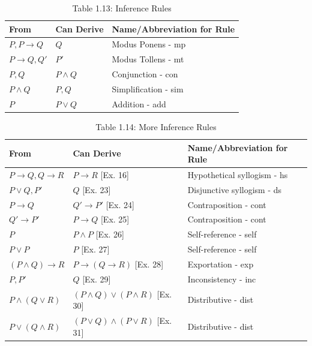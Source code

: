 \documentclass{article}
\begin{document}
\begin{table}[h]
    \centering
    \caption*{Table 1.13: Inference Rules}
    \begin{tabular}{l l l}
        \toprule
        From & Can Derive & Name/Abbreviation for Rule \\
        \midrule
        \(P, P \rightarrow Q\) & \(Q\) & Modus Ponens - mp \\
        \(P \rightarrow Q, Q'\) & \(P'\) & Modus Tollens - mt \\
        \(P, Q\) & \(P \land Q\) & Conjunction - con \\
        \(P \land Q\) & \(P, Q\) & Simplification - sim \\
        \(P\) & \(P \lor Q\) & Addition - add \\
        \bottomrule
    \end{tabular}
\end{table}

\begin{table}[h]
    \centering
    \caption*{Table 1.14: More Inference Rules}
    \begin{tabular}{l l l}
        \toprule
        From & Can Derive & Name/Abbreviation for Rule \\
        \midrule
        \(P \rightarrow Q, Q \rightarrow R\) & \(P \rightarrow R\) [Ex. 16] & Hypothetical syllogism - hs \\
        \(P \lor Q, P'\) & \(Q\) [Ex. 23] & Disjunctive syllogism - ds \\
        \(P \rightarrow Q\) & \(Q' \rightarrow P'\) [Ex. 24] & Contraposition - cont \\
        \(Q' \rightarrow P'\) & \(P \rightarrow Q\) [Ex. 25] & Contraposition - cont \\
        \(P\) & \(P \land P\) [Ex. 26] & Self-reference - self \\
        \(P \lor P\) & \(P\) [Ex. 27] & Self-reference - self \\
        \((P \land Q) \rightarrow R\) & \(P \rightarrow (Q \rightarrow R)\) [Ex. 28] & Exportation - exp \\
        \(P, P'\) & \(Q\) [Ex. 29] & Inconsistency - inc \\
        \(P \land (Q \lor R)\) & \((P \land Q) \lor (P \land R)\) [Ex. 30] & Distributive - dist \\
        \(P \lor (Q \land R)\) & \((P \lor Q) \land (P \lor R)\) [Ex. 31] & Distributive - dist \\
        \bottomrule
    \end{tabular}
\end{table}
\end{document}
